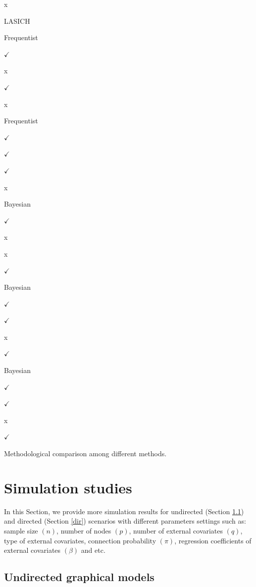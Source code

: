 \documentclass[
]{book}
\begin{document}
x

LASICH \citep{saegusa2016joint}

Frequentist

\(\checkmark\)

x

\(\checkmark\)

x

\citet{zhang2022high}

Frequentist

\(\checkmark\)

\(\checkmark\)

\(\checkmark\)

x

\citet{peterson2015bayesian}

Bayesian

\(\checkmark\)

x

x

\(\checkmark\)

\citet{ni2019bayesian}

Bayesian

\(\checkmark\)

\(\checkmark\)

x

\(\checkmark\)

\citet{wang2021bayesian}

Bayesian

\(\checkmark\)

\(\checkmark\)

x

\(\checkmark\)

\label{tab:differentmodeloverviewqsn4} Methodological comparison among different methods.

\hypertarget{simulation}{%
\chapter{Simulation studies}\label{simulation}}

In this Section, we provide more simulation results for undirected (Section \ref{undir}) and directed (Section \ref{dir}) scenarios with different parameters settings such as: sample size \((n)\), number of nodes \((p)\), number of external covariates \((q)\), type of external covariates, connection probability \((\pi)\), regression coefficients of external covariates \((\beta)\) and etc.

\hypertarget{undir}{%
\section{Undirected graphical models}\label{undir}}
\end{document}
